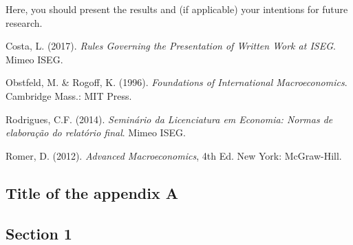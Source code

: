 \documentclass [12pt,a4paper,oneside]{article}
\begin{document}
Here, you should present the results and (if applicable) your intentions for future research.


%

\clearpage
\begin{thebibliography}{9}

\item
Costa, L. (2017). \textit{Rules Governing the Presentation of Written Work at ISEG}. Mimeo ISEG.

\item
Obstfeld, M. \& Rogoff, K. (1996). \textit{Foundations of International Macroeconomics}. Cambridge Mass.: MIT Press.

\item
Rodrigues, C.F. (2014). \textit{Seminário da Licenciatura em Economia: Normas de elaboração do relatório final}. Mimeo ISEG.

\item
Romer, D. (2012). \textit{Advanced Macroeconomics}, 4th Ed. New York: McGraw-Hill.

\end{thebibliography}


\newpage
\begin{appendices}
\section{Title of the appendix A} \label{chap:appendixA}
\subsection{Section 1} \label{sec:A1}


\end{appendices}
\end{document}
